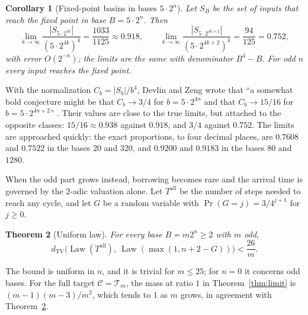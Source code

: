 \documentclass[11pt]{amsart}
\newtheorem{theorem}{Theorem}
\newtheorem{corollary}[theorem]{Corollary}
\theoremstyle{remark}
\newcommand{\T}{\mathcal{T}}
\newcommand{\C}{\mathcal{C}}
\newcommand{\dtv}{d_{\mathrm{TV}}}
\begin{document}
\begin{corollary}[Fixed-point basins in bases $5\cdot2^n$]\label{cor:basin}
Let $S_B$ be the set of inputs that reach the fixed point in base $B=5\cdot2^n$. Then
\[
\lim_{k\to\infty}\frac{|S_{5\cdot2^{4k}}|}{(5\cdot2^{4k})^4}=\frac{1033}{1125}\approx0.918,\qquad
\lim_{k\to\infty}\frac{|S_{5\cdot2^{4k+2}}|}{(5\cdot2^{4k+2})^4}=\frac{94}{125}=0.752,
\]
with error $O(2^{-n})$; the limits are the same with denominator $B^4-B$. For odd $n$ every input reaches the fixed point.
\end{corollary}

With the normalization $C_b=|S_b|/b^4$, Devlin and Zeng wrote that ``a somewhat bold conjecture might be that $C_b\to3/4$ for $b=5\cdot2^{4n}$ and that $C_b\to15/16$ for $b=5\cdot2^{4n+2}$'' \cite[p.~5]{DZ}. Their values are close to the true limits, but attached to the opposite classes: $15/16\approx0.938$ against $0.918$, and $3/4$ against $0.752$. The limits are approached quickly: the exact proportions, to four decimal places, are $0.7608$ and $0.7522$ in the bases $20$ and $320$, and $0.9200$ and $0.9183$ in the bases $80$ and $1280$.

When the odd part grows instead, borrowing becomes rare and the arrival time is governed by the $2$-adic valuation alone. Let $T^{\mathrm{all}}$ be the number of steps needed to reach any cycle, and let $G$ be a random variable with $\Pr(G=j)=3/4^{j+1}$ for $j\ge0$.

\begin{theorem}[Uniform law]\label{thm:uniform}
For every base $B=m2^n\ge2$ with $m$ odd,
\[
\dtv\bigl(\operatorname{Law}(T^{\mathrm{all}}),\ \operatorname{Law}(\max(1,n+2-G))\bigr)<\frac{26}m.
\]
\end{theorem}

The bound is uniform in $n$, and it is trivial for $m\le25$; for $n=0$ it concerns odd bases. For the full target $\C=\T_m$, the mass at ratio $1$ in Theorem~\ref{thm:limit} is $(m-1)(m-3)/m^2$, which tends to $1$ as $m$ grows, in agreement with Theorem~\ref{thm:uniform}.
\end{document}
